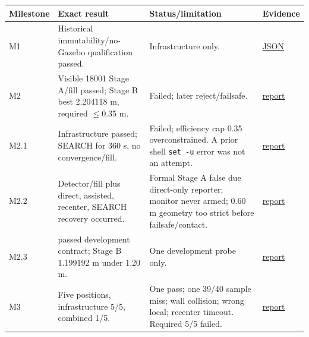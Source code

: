 \documentclass[
  10pt,
  letterpaper,
]{article}
\newcounter{none} %
\begin{document}
{\def\LTcaptype{none} %
\begin{longtable}[]{@{}
  >{\raggedright\arraybackslash}p{}
  >{\raggedright\arraybackslash}p{}
  >{\raggedright\arraybackslash}p{}
  >{\raggedright\arraybackslash}p{}@{}}
\toprule\noalign{}
\begin{minipage}[b]{\linewidth}\raggedright
Milestone
\end{minipage} & \begin{minipage}[b]{\linewidth}\raggedright
Exact result
\end{minipage} & \begin{minipage}[b]{\linewidth}\raggedright
Status/limitation
\end{minipage} & \begin{minipage}[b]{\linewidth}\raggedright
Evidence
\end{minipage} \\
\midrule\noalign{}
\endhead
\bottomrule\noalign{}
\endlastfoot
M1 & Historical immutability/no-Gazebo qualification passed. & Infrastructure only. & \href{validation/phase_08_7_m1_historical_immutability.json}{JSON} \\
M2 & Visible 18001 Stage A/fill passed; Stage B best 2.204118 m, required $\leq 0.35$ m. & Failed; later reject/failsafe. & \href{validation/phase_08_7_m2_geometry_probe_report.md}{report} \\
M2.1 & Infrastructure passed; SEARCH for 360 s, no convergence/fill. & Failed; efficiency cap 0.35 overconstrained. A prior shell \texttt{set -u} error was not an attempt. & \href{validation/phase_08_7_m2_1_correction_probe_report.md}{report} \\
M2.2 & Detector/fill plus direct, assisted, recenter, SEARCH recovery occurred. & Formal Stage A false due direct-only reporter; monitor never armed; 0.60 m geometry too strict before failsafe/contact. & \href{validation/phase_08_7_m2_2_efficiency_correction_probe_report.md}{report} \\
M2.3 & 18001 passed development contract; Stage B 1.199192 m under 1.20 m. & One development probe only. & \href{validation/phase_08_7_m2_3_assisted_recovery_stop_probe_report.md}{report} \\
M3 & Five positions, infrastructure 5/5, combined 1/5. & One pass; one 39/40 sample miss; wall collision; wrong local; recenter timeout. Required 5/5 failed. & \href{validation/phase_08_7_m3_spatial_suite_report.md}{report} \\

\end{longtable}}
\end{document}

